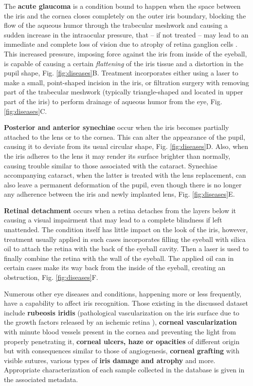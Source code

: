 \documentclass[conference]{IEEEtran}
\begin{document}
The \textbf{acute glaucoma} is a condition bound to happen when the space between the iris and the cornea closes completely on the outer iris boundary, blocking the flow of the aqueous humor through the trabecular meshwork and causing a sudden increase in the intraocular pressure, that -- if not treated -- may lead to an immediate and complete loss of vision due to atrophy of retina ganglion cells \cite{GlaucomaWHO}. This increased pressure, imposing force against the iris from inside of the eyeball, is capable of causing a certain \emph{flattening} of the iris tissue and a distortion in the pupil shape, Fig. \ref{fig:diseases}B. Treatment incorporates either using a laser to make a small, point-shaped incision in the iris, or filtration surgery with removing part of the trabecular meshwork (typically triangle-shaped and located in upper part of the iris) to perform drainage of aqueous humor from the eye, Fig. \ref{fig:diseases}C.

 \textbf{Posterior and anterior synechiae} occur when the iris becomes partially attached to the lens or to the cornea. This can alter the appearance of the pupil, causing it to deviate from its usual circular shape, Fig. \ref{fig:diseases}D. Also, when the iris adheres to the lens it may render its surface brighter than normally, causing trouble similar to those associated with the cataract. Synechiae accompanying cataract, when the latter is treated with the lens replacement, can also leave a permanent deformation of the pupil, even though there is no longer any adherence between the iris and newly implanted lens, Fig. \ref{fig:diseases}E.
  
 \textbf{Retinal detachment} occurs when a retina detaches from the layers below it causing a visual impairment that may lead to a complete blindness if left unattended. The condition itself has little impact on the look of the iris, however, treatment usually applied in such cases incorporates filling the eyeball with silica oil to attach the retina with the back of the eyeball cavity. Then a laser is used to finally combine the retina with the wall of the eyeball. The applied oil can in certain cases make its way back from the inside of the eyeball, creating an obstruction, Fig. \ref{fig:diseases}F.

Numerous other eye diseases and conditions, happening more or less frequently, have a capability to affect iris recognition. Those existing in the discussed dataset include \textbf{rubeosis iridis} (pathological vascularization on the iris surface due to the growth factors released by an ischemic retina \cite{Rubeosis}), \textbf{corneal vascularization} with minute blood vessels present in the cornea and preventing the light from properly penetrating it, \textbf{corneal ulcers, haze or opacities} of different origin but with consequences similar to those of angiogenesis, \textbf{corneal grafting} with visible sutures, various types of \textbf{iris damage and atrophy} and more. Appropriate characterization of each sample collected in the database is given in the associated metadata. 
\end{document}
